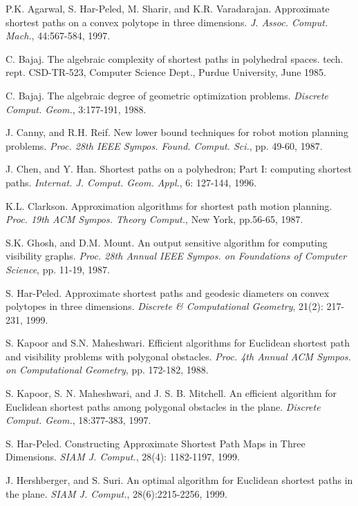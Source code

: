 \documentclass{llncs}
\begin{document}
\baselineskip=12pt
\begin{thebibliography}{}

P.K. Agarwal, S. Har-Peled, M. Sharir, and K.R. Varadarajan.
Approximate shortest paths on a convex polytope in three dimensions.
{\it J. Assoc. Comput. Mach.}, 44:567-584, 1997.

C. Bajaj.
The algebraic complexity of shortest paths in polyhedral spaces.
tech. rept. CSD-TR-523, Computer Science Dept., Purdue University, June 1985.


C. Bajaj.
The algebraic degree of geometric optimization problems.
{\it Discrete Comput. Geom.}, 3:177-191, 1988.


J. Canny, and R.H. Reif.
New lower bound techniques for robot motion planning problems.
{\it Proc. 28th IEEE Sympos. Found. Comput. Sci.}, pp. 49-60, 1987.

J. Chen, and Y. Han.
Shortest paths on a polyhedron; Part I: computing shortest paths.
{\it Internat. J. Comput. Geom. Appl.}, 6: 127-144, 1996.

K.L. Clarkson.
Approximation algorithms for shortest path motion planning.
{\it Proc. 19th ACM Sympos. Theory Comput.}, New York, pp.56-65, 1987.

S.K. Ghosh, and D.M. Mount.
An output sensitive algorithm for computing visibility graphs.
{\it Proc. 28th Annual IEEE Sympos. on Foundations of Computer Science}, pp. 11-19, 1987.

S. Har-Peled.
Approximate shortest paths and geodesic diameters on convex polytopes in three dimensions.
\emph{Discrete \& Computational Geometry}, 21(2): 217-231, 1999.

S. Kapoor and S.N. Maheshwari.
Efficient algorithms for Euclidean shortest path and visibility
problems with polygonal obstacles.
{\it Proc. 4th Annual ACM Sympos. on Computational Geometry}, pp. 172-182, 1988.

S. Kapoor, S. N. Maheshwari, and J. S. B. Mitchell.
An efficient algorithm for Euclidean shortest paths among polygonal obstacles in the plane.
{\it Discrete Comput. Geom.}, 18:377-383, 1997.

S. Har-Peled.
Constructing Approximate Shortest Path Maps in Three Dimensions.
{\it SIAM J. Comput.}, 28(4): 1182-1197, 1999.

J. Hershberger, and S. Suri.
An optimal algorithm for Euclidean shortest paths in the plane.
{\it SIAM J. Comput.}, 28(6):2215-2256, 1999.


\end{thebibliography}
\end{document}
